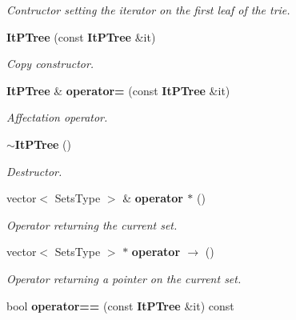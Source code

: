\begin{CompactItemize}
\begin{CompactList}\small\item\em Contructor setting the iterator on the first leaf of the trie. \item\end{CompactList}\item 
{\bf It\-PTree} (const {\bf It\-PTree} \&it)\label{class_it_p_tree_117622ebdf8424515868e2de71586c6a}

\begin{CompactList}\small\item\em Copy constructor. \item\end{CompactList}\item 
{\bf It\-PTree} \& {\bf operator=} (const {\bf It\-PTree} \&it)\label{class_it_p_tree_4f4f9bf0510afd02ceae063985f4366c}

\begin{CompactList}\small\item\em Affectation operator. \item\end{CompactList}\item 
{\bf $\sim$It\-PTree} ()\label{class_it_p_tree_52ad99488e1ce902784c99f5a1b74ebb}

\begin{CompactList}\small\item\em Destructor. \item\end{CompactList}\item 
vector$<$ Sets\-Type $>$ \& {\bf operator $\ast$} ()\label{class_it_p_tree_1fd34185f8b28f6029c93142b705373c}

\begin{CompactList}\small\item\em Operator returning the current set. \item\end{CompactList}\item 
vector$<$ Sets\-Type $>$ $\ast$ {\bf operator $\rightarrow$ } ()\label{class_it_p_tree_dfd046def36cc49a70979af63d38a03a}

\begin{CompactList}\small\item\em Operator returning a pointer on the current set. \item\end{CompactList}\item 
bool {\bf operator==} (const {\bf It\-PTree} \&it) const \label{class_it_p_tree_b9077c68640add8a17995fd47157d457}


\end{CompactItemize}
